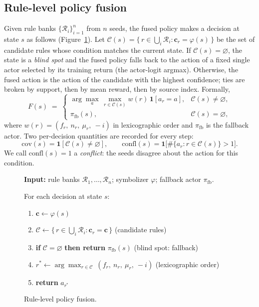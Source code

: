\documentclass[11pt]{article}
\begin{document}
\subsection{Rule-level policy fusion}
\label{sec:method:fusion}

Given rule banks $\{\mathcal{R}_i\}_{i=1}^{n}$ from $n$ seeds, the fused policy makes a decision at
state $s$ as follows (Figure~\ref{alg:fusion}). Let
$\mathcal{C}(s)=\{\,r\in\textstyle\bigcup_i \mathcal{R}_i : \mathbf{c}_r=\varphi(s)\,\}$ be the set of
candidate rules whose condition matches the current state. If $\mathcal{C}(s)=\varnothing$, the
state is a \emph{blind spot} and the fused policy falls back to the action of a fixed single actor
selected by its training return (the actor-logit argmax). Otherwise, the fused action is the action
of the candidate with the highest confidence; ties are broken by support, then by mean reward, then
by source index. Formally,
\begin{equation}
F(s) \;=\; \begin{cases}
\displaystyle \arg\max_{a}\,\max_{r\in\mathcal{C}(s)} w(r)\,\mathbf{1}[a_r=a], & \mathcal{C}(s)\neq\varnothing,\\[2mm]
\pi_{\mathrm{fb}}(s), & \mathcal{C}(s)=\varnothing,
\end{cases}
\label{eq:fusion}
\end{equation}
where $w(r)=(f_r,\ n_r,\ \mu_r,\ -i)$ in lexicographic order and $\pi_{\mathrm{fb}}$ is the fallback
actor. Two per-decision quantities are recorded for every step:
\begin{equation}
\mathrm{cov}(s)=\mathbf{1}[\mathcal{C}(s)\neq\varnothing], \qquad
\mathrm{confl}(s)=\mathbf{1}\big[\#\{a_r : r\in\mathcal{C}(s)\}>1\big].
\label{eq:coverage}
\end{equation}
We call $\mathrm{confl}(s)=1$ a \emph{conflict}: the seeds disagree about the action for this
condition.

\begin{figure}[t]
\centering
\caption{Rule-level policy fusion.}
\label{alg:fusion}
\begin{minipage}{0.88\textwidth}
\small
\textbf{Input:} rule banks $\mathcal{R}_1,\ldots,\mathcal{R}_n$; symbolizer $\varphi$; fallback actor $\pi_{\mathrm{fb}}$.
\vspace{0.35em}

For each decision at state $s$:
\begin{enumerate}
  \item $\mathbf{c}\leftarrow \varphi(s)$
  \item $\mathcal{C}\leftarrow\{\,r\in\bigcup_i\mathcal{R}_i : \mathbf{c}_r=\mathbf{c}\,\}$ \hfill (candidate rules)
  \item \textbf{if} $\mathcal{C}=\varnothing$ \textbf{then return} $\pi_{\mathrm{fb}}(s)$ \hfill (blind spot: fallback)
  \item $r^{*}\leftarrow \arg\max_{r\in\mathcal{C}}\ (f_r,\ n_r,\ \mu_r,\ -i)$ \hfill (lexicographic order)
  \item \textbf{return} $a_{r^{*}}$
\end{enumerate}
\end{minipage}
\end{figure}
\end{document}

